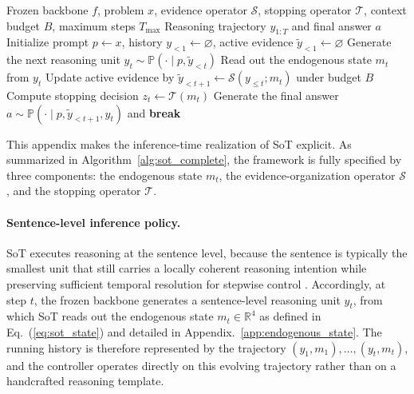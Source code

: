 \begin{algorithm}[b]
\caption{State of Thought (SoT) inference}
\label{alg:sot_complete}
\begin{algorithmic}[1]
\REQUIRE Frozen backbone \(f\), problem \(x\), evidence operator \(\mathcal{S}\), stopping operator \(\mathcal{T}\), context budget \(B\), maximum steps \(T_{\max}\)
\ENSURE Reasoning trajectory \(y_{1:T}\) and final answer \(a\)
\STATE Initialize prompt \(p \gets x\), history \(y_{<1}\gets \varnothing\), active evidence \(\widetilde{y}_{<1}\gets \varnothing\)
    \STATE Generate the next reasoning unit \(y_t \sim \mathbb{P}(\cdot \mid p,\widetilde{y}_{<t})\)
    \STATE Read out the endogenous state \(m_t\) from \(y_t\)
    \STATE Update active evidence by \(\widetilde{y}_{<t+1} \gets \mathcal{S}(y_{\le t};m_t)\) under budget \(B\)
    \STATE Compute stopping decision \(z_t \gets \mathcal{T}(m_t)\)
        \STATE Generate the final answer \(a \sim \mathbb{P}(\cdot \mid p,\widetilde{y}_{<t+1},y_t)\) and \textbf{break}
    \ENDIF
\ENDFOR
\end{algorithmic}
\end{algorithm}

This appendix makes the inference-time realization of SoT explicit. 
As summarized in Algorithm~\ref{alg:sot_complete}, the framework is fully specified by three components: the endogenous state \(m_t\), the evidence-organization operator \(\mathcal{S}\), and the stopping operator \(\mathcal{T}\).

\paragraph{Sentence-level inference policy.}
SoT executes reasoning at the sentence level, because the sentence is typically the smallest unit that still carries a locally coherent reasoning intention while preserving sufficient temporal resolution for stepwise control \citep{bogdan2025thought,liu2026think,wang2023plan}. 
Accordingly, at step \(t\), the frozen backbone generates a sentence-level reasoning unit \(y_t\), from which SoT reads out the endogenous state \(m_t\in\mathbb{R}^{4}\) as defined in Eq.~(\ref{eq:sot_state}) and detailed in Appendix.~\ref{app:endogenous_state}. 
The running history is therefore represented by the trajectory \((y_1,m_1),\dots,(y_t,m_t)\), and the controller operates directly on this evolving trajectory rather than on a handcrafted reasoning template.

